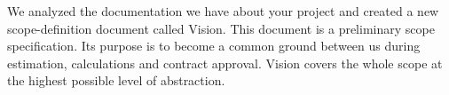 
We analyzed the documentation we have about your project and 
created a new scope-definition document called Vision. This document
is a preliminary scope specification. Its purpose is to become
a common ground between us during estimation, calculations and contract
approval. Vision covers the whole scope at the highest possible level
of abstraction.
